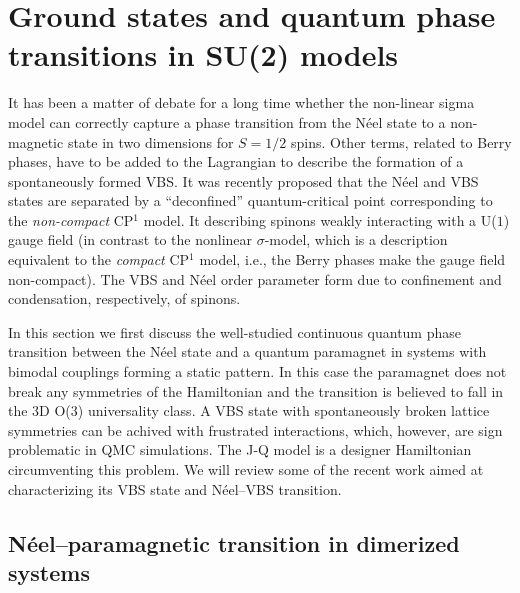 \documentclass[range]{ar2e}
\begin{document}
\section{Ground states and quantum phase transitions in SU(2) models}
\label{sec:su2models}

It has been a matter of debate for a long time whether the non-linear sigma model can correctly capture a phase transition from the N\'eel state 
to a non-magnetic state in two dimensions for $S=1/2$ spins. Other terms, related to Berry phases, have to be added to the Lagrangian to describe the 
formation of a spontaneously formed VBS. It was recently proposed that the N\'eel and VBS states are separated by a ``deconfined'' quantum-critical 
point \cite{Senthil04a} corresponding to the {\it non-compact} CP$^1$ model. It  describing spinons weakly interacting with a U($1$) gauge field (in contrast 
to the nonlinear $\sigma$-model, which is a description equivalent to the {\it compact} CP$^1$ model, i.e., the Berry phases make the gauge field non-compact). 
The VBS and N\'eel order parameter form due to confinement and condensation, respectively, of spinons. 

In this section we first discuss the well-studied continuous quantum phase transition between the N\'eel state and a quantum paramagnet in systems 
with bimodal couplings forming a static pattern. In this case the paramagnet does not break any symmetries of the Hamiltonian and the transition 
is believed to fall in the 3D O($3$) universality class. A VBS state with spontaneously broken lattice symmetries can be achived with frustrated 
interactions, which, however, are sign problematic in QMC simulations. The J-Q model \cite{Sandvik07} is a designer Hamiltonian circumventing this 
problem. We will review some of the recent work aimed at characterizing its VBS state and  N\'eel--VBS transition.

\subsection{N\'eel--paramagnetic transition in dimerized systems}
\end{document}
